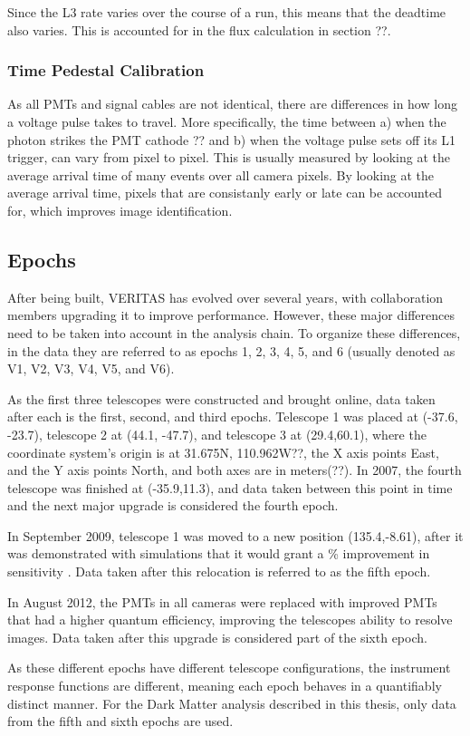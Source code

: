 Since the L3 rate varies over the course of a run, this means that the deadtime also varies.
This is accounted for in the flux calculation in section ??.

\subsubsection{Time Pedestal Calibration}
As all PMTs and signal cables are not identical, there are differences in how long a voltage pulse takes to travel.
More specifically, the time between a) when the photon strikes the PMT cathode ?? and b) when the voltage pulse sets off its L1 trigger, can vary from pixel to pixel.
This is usually measured by looking at the average arrival time of many events over all camera pixels.
By looking at the average arrival time, pixels that are consistanly early or late can be accounted for, which improves image identification.

\subsection{Epochs}\label{sec:epochs}
After being built, VERITAS has evolved over several years, with collaboration members upgrading it to improve performance.
However, these major differences need to be taken into account in the analysis chain.
To organize these differences, in the data they are referred to as epochs 1, 2, 3, 4, 5, and 6 (usually denoted as V1, V2, V3, V4, V5, and V6).

As the first three telescopes were constructed and brought online, data taken after each is the first, second, and third epochs.
Telescope 1 was placed at (-37.6, -23.7), telescope 2 at (44.1, -47.7), and telescope 3 at (29.4,60.1), where the coordinate system's origin is at 31.675N, 110.962W??, the X axis points East, and the Y axis points North, and both axes are in meters(??).
In 2007, the fourth telescope was finished at (-35.9,11.3), and data taken between this point in time and the next major upgrade is considered the fourth epoch.

In September 2009, telescope 1 was moved to a new position (135.4,-8.61), after it was demonstrated with simulations that it would grant a \% improvement in sensitivity \cite{veritas_t1_move}.
Data taken after this relocation is referred to as the fifth epoch.

In August 2012, the PMTs in all cameras were replaced with improved PMTs that had a higher quantum efficiency, improving the telescopes ability to resolve images\cite{pmtmodels}.
Data taken after this upgrade is considered part of the sixth epoch.

As these different epochs have different telescope configurations, the instrument response functions are different, meaning each epoch behaves in a quantifiably distinct manner.
For the Dark Matter analysis described in this thesis, only data from the fifth and sixth epochs are used.


